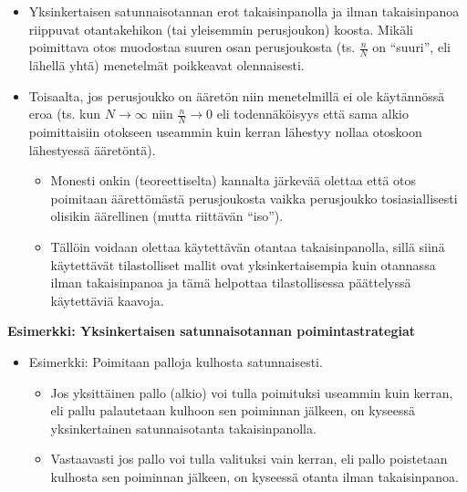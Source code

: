 \documentclass[
]{book}
\providecommand{\tightlist}{%
  \setlength{\itemsep}{0pt}\setlength{\parskip}{0pt}}
\begin{document}
\begin{itemize}
\tightlist
\item
  Yksinkertaisen satunnaisotannan erot takaisinpanolla ja ilman takaisinpanoa riippuvat otantakehikon (tai yleisemmin perusjoukon) koosta. Mikäli poimittava otos muodostaa suuren osan perusjoukosta (ts. \(\frac{n}{N}\) on ``suuri'', eli lähellä yhtä) menetelmät poikkeavat olennaisesti.
\item
  Toisaalta, jos perusjoukko on ääretön niin menetelmillä ei ole käytännössä eroa (ts. kun \(N \longrightarrow \infty\) niin \(\frac{n}{N} \longrightarrow 0\) eli todennäköisyys että sama alkio poimittaisiin otokseen useammin kuin kerran lähestyy nollaa otoskoon lähestyessä ääretöntä).

  \begin{itemize}
  \tightlist
  \item
    Monesti onkin (teoreettiselta) kannalta järkevää olettaa että otos poimitaan äärettömästä perusjoukosta vaikka perusjoukko tosiasiallisesti olisikin äärellinen (mutta riittävän ``iso'').
  \item
    Tällöin voidaan olettaa käytettävän otantaa takaisinpanolla, sillä siinä käytettävät tilastolliset mallit ovat yksinkertaisempia kuin otannassa ilman takaisinpanoa ja tämä helpottaa tilastollisessa päättelyssä käytettäviä kaavoja.
  \end{itemize}
\end{itemize}

\begin{eblock}{}

\textbf{Esimerkki: Yksinkertaisen satunnaisotannan poimintastrategiat}

\begin{itemize}
\tightlist
\item
  Esimerkki: Poimitaan palloja kulhosta satunnaisesti.

  \begin{itemize}
  \tightlist
  \item
    Jos yksittäinen pallo (alkio) voi tulla poimituksi useammin kuin kerran, eli pallu palautetaan kulhoon sen poiminnan jälkeen, on kyseessä yksinkertainen satunnaisotanta takaisinpanolla.
  \item
    Vastaavasti jos pallo voi tulla valituksi vain kerran, eli pallo poistetaan kulhosta sen poiminnan jälkeen, on kyseessä otanta ilman takaisinpanoa.
  \end{itemize}
\end{itemize}

\end{eblock}
\end{document}
